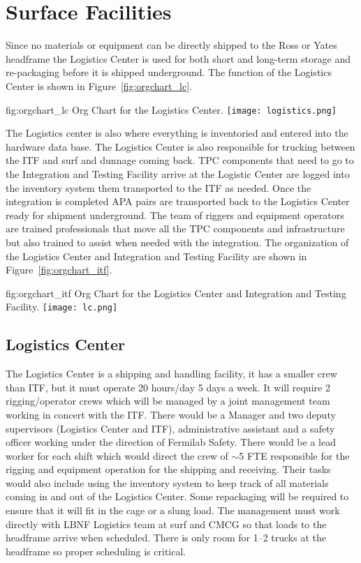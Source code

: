 \section{Surface Facilities}

Since no materials or equipment can be directly shipped to the Ross or
Yates headframe the Logistics Center is used for both short and
long-term storage and re-packaging before it is shipped underground.
The function of the Logistics Center is shown in
Figure~\ref{fig:orgchart_lc}.
\begin{dunefigure}{fig:orgchart_lc}
  {Org Chart for the Logistics Center.}
  \texttt{[image: logistics.png]}
\end{dunefigure}
The Logistics center is also where everything is inventoried and
entered into the hardware data base.  The Logistics Center is also
responsible for trucking between the ITF and {surf} and dunnage coming
back.  TPC components that need to go to the Integration and Testing
Facility arrive at the Logistic Center are logged into the inventory
system them transported to the ITF as needed. Once the integration is
completed APA pairs are transported back to the Logistics Center ready
for shipment underground.  The team of riggers and equipment operators
are trained professionals that move all the TPC components and
infrastructure but also trained to assist when needed with the
integration. The organization of the Logistics Center and Integration
and Testing Facility are shown in Figure~\ref{fig:orgchart_itf}.
\begin{dunefigure}{fig:orgchart_itf}
  {Org Chart for the Logistics Center and Integration and Testing
    Facility.}  \texttt{[image: lc.png]}
\end{dunefigure}

\subsection{Logistics Center}

The Logistics Center is a shipping and handling facility, it has a
smaller crew than ITF, but it must operate 20 hours/day 5 days a week.
It will require 2 rigging/operator crews which will be managed by a
joint management team working in concert with the ITF.  There would be
a Manager and two deputy supervisors (Logistics Center and ITF),
administrative assistant and a safety officer working under the direction
of Fermilab Safety.  There would be a lead worker for each shift which
would direct the crew of $\sim$5 FTE responsible for the rigging and
equipment operation for the shipping and receiving.  Their tasks would
also include using the inventory system to keep track of all materials
coming in and out of the Logistics Center. Some repackaging will be
required to ensure that it will fit in the cage or a slung load.  The
management must work directly with LBNF Logistics team at {surf} and
CMCG so that loads to the headframe arrive when scheduled.  There is
only room for 1--2 trucks at the headframe so proper scheduling is
critical.

